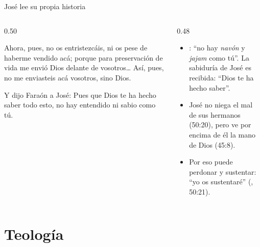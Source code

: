 \begin{frame}{José lee su propia historia}
\begin{columns}[t,onlytextwidth]
\begin{column}{0.50\textwidth}
\begin{cita}Ahora, pues, no os entristezcáis, ni os pese de haberme vendido acá; porque para preservación de vida me envió Dios delante de vosotros\ldots{} Así, pues, no me enviasteis acá vosotros, sino Dios.\end{cita}
\begin{cita}Y dijo Faraón a José: Pues que Dios te ha hecho saber todo esto, no hay entendido ni sabio como tú.\end{cita}
\end{column}
\begin{column}{0.48\textwidth}\small
\begin{itemize}
\item {}: ``no hay \emph{navón} y \emph{jajam} como tú''. La sabiduría de José es recibida: ``Dios te ha hecho saber''.
\item José no niega el mal de sus hermanos (50:20), pero ve por encima de él la mano de Dios (45:8).
\item Por eso puede perdonar y sustentar: ``yo os sustentaré'' (, 50:21).
\end{itemize}
\end{column}
\end{columns}
\end{frame}

\section{Teología}

